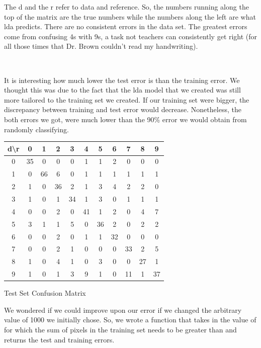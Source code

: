 \documentclass[10pt]{extarticle}
\begin{document}
\begin{minipage}{.4\textwidth}
The d and the r refer to data and reference. So, the numbers running along the top of the matrix are the true numbers while the numbers along the left are what lda predicts. There are no consistent errors in the data set. The greatest errors come from confusing 4s with 9s, a task not teachers can consistently get right (for all those times that Dr. Brown couldn't read my handwriting).
\end{minipage}\\
\begin{minipage}{.45\textwidth}
	It is interesting how much lower the test error is than the training error. We thought this was due to the fact that the lda model that we created was still more tailored to the training set we created. If our training set were bigger, the discrepancy between training and test error would decrease. Nonetheless, the both errors we got, were much lower than the 90\% error we would obtain from randomly classifying.
\end{minipage}
\begin{minipage}{.05\textwidth}
	\quad
\end{minipage}
\begin{minipage}{.5\textwidth}
	\begin{center}
	\begin{tabular}{c | c c c c c c c c c c}
		d\textbackslash r & 0 & 1 & 2 & 3 & 4 & 5 & 6 & 7 & 8 & 9\\ \hline
		0&35&0&0&0&1&1&2&0&0&0\\
		1&0&66&6&0&1&1&1&1&1&1\\
		2&1&0&36&2&1&3&4&2&2&0\\
		3&1&0&1&34&1&3&0&1&1&1\\
		4&0&0&2&0&41&1&2&0&4&7\\
		5&3&1&1&5&0&36&2&0&2&2\\
		6&0&0&2&0&1&1&32&0&0&0\\
		7&0&0&2&1&0&0&0&33&2&5\\
		8&1&0&4&1&0&3&0&0&27&1\\
		9&1&0&1&3&9&1&0&11&1&37\\
	\end{tabular}
	\bigskip
	Test Set Confusion Matrix
	\end{center}
\end{minipage}	
We wondered if we could improve upon our error if we changed the arbitrary value of 1000 we initially chose. So, we wrote a function that takes in the value of for which the sum of pixels in the training set needs to be greater than and returns the test and training errors.\\\\
\end{document}

